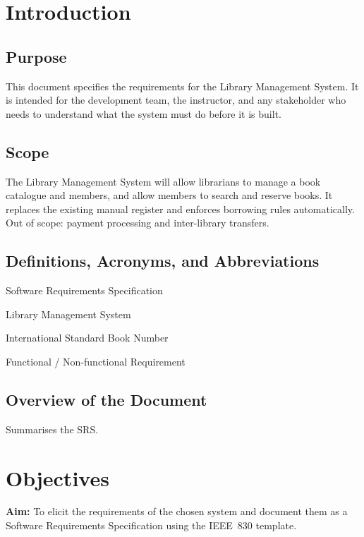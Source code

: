 \documentclass[11pt,a4paper]{article}
\newcommand{\projecttitle}{Library Management System}   %
\begin{document}
\clearpage
\tableofcontents
\clearpage

\section{Introduction}

\subsection{Purpose}
This document specifies the requirements for the \projecttitle{}. It is intended
for the development team, the instructor, and any stakeholder who needs to
understand what the system must do before it is built.

\subsection{Scope}
The \projecttitle{} will allow librarians to manage a book catalogue and members,
and allow members to search and reserve books. It replaces the existing manual
register and enforces borrowing rules automatically. Out of scope: payment
processing and inter-library transfers.

\subsection{Definitions, Acronyms, and Abbreviations}
\begin{description}[leftmargin=2.5cm,style=nextline]
  \item[SRS] Software Requirements Specification
  \item[LMS] Library Management System
  \item[ISBN] International Standard Book Number
  \item[FR / NFR] Functional / Non-functional Requirement
\end{description}

\subsection{Overview of the Document}
Summarises the SRS.

\section{Objectives}
\textbf{Aim:} To elicit the requirements of the chosen system and document them as a
Software Requirements Specification using the IEEE~830 template.
\end{document}
